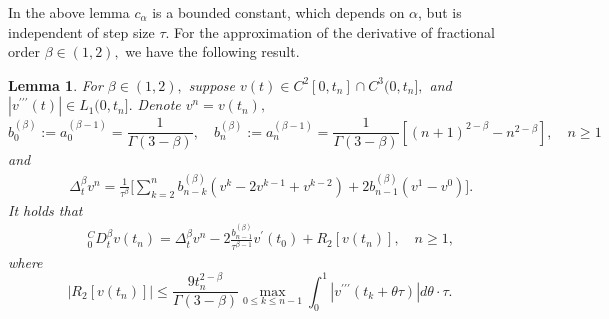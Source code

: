 \documentclass[11pt]{article}
\providecommand{\bh}[1]{#1}
\newtheorem{lem}[thm]{Lemma}
\begin{document}
 In the above lemma $c_{\alpha}$ is a bounded constant, which depends on $\alpha$, but is independent of step size \bh{$\tau$.} 
For the approximation of the derivative of fractional order $\beta \in(1,2),$ we have the following result.
\begin{lem}\label{dis-lemma-2}
For $\beta \in(1,2), $  suppose  $v(t)\in C^{2}[0,t_n]\cap C^{3}(0,t_n], $ and $|v^{\prime\prime\prime}(t)|\in L_1(0,t_n].$  Denote $v^n=v(t_n),$
\begin{equation}
b_0^{(\beta)}:=a_{0}^{(\beta-1)}=\frac{1}{\Gamma{(3-\beta)}},\quad b_n^{(\beta)}:=a_n^{(\beta-1)}=
\frac{1}{\Gamma{(3-\beta)}}[(n+1)^{2-\beta}-n^{2-\beta}],\quad n\geq 1 \label{coefficients-2}\end{equation}
and
\begin{eqnarray}\label{eq:def-be}
&&\Delta_t^{\beta}v^n=
\frac{1}{\tau^{\beta}}\biggl[  \sum_{k=2}^{n} b_{n-k}^{(\beta)}(v^k-2v^{k-1}+v^{k-2})+ 2b_{n-1}^{(\beta)}(v^1-v^0) \biggl].
\end{eqnarray}  It holds that
\begin{eqnarray} \label{denotion-be}
&& _0^CD_t^{\beta}v(t_n)=\Delta_t^{\beta}v^n- 2  \frac{b_{n-1}^{(\beta)}}{\tau^{\beta-1}}  v^{\prime}(t_0)  +R_2[v(t_n)],\quad n\geq 1,
\end{eqnarray}
where
$$ |R_2[v(t_n)]|\leq \frac{9t_n^{2-\beta}}{\Gamma{(3-\beta)}} \max_{0\leq k\leq n-1}\int_{0}^{1}|v^{\prime\prime\prime}(t_{k}+\theta \tau)|d\theta \cdot \tau.$$
\end{lem}
\end{document}
